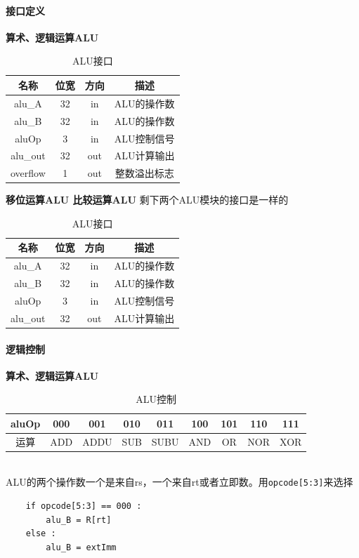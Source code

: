 \documentclass[UTF8]{ctexart}
\begin{document}
\paragraph{接口定义}
\textbf{算术、逻辑运算ALU}
\begin{table}[h]
    \centering
    \begin{tabular}{|c|c|c|c|}
        \hline  
        名称 & 位宽 & 方向 & 描述 \\
        \hline  
        alu\_A & 32 & in & ALU的操作数 \\
        \hline 
        alu\_B & 32 & in & ALU的操作数 \\
        \hline 
        aluOp & 3 & in & ALU控制信号 \\
        \hline
        alu\_out & 32 & out & ALU计算输出 \\
        \hline
        overflow & 1 & out & 整数溢出标志 \\
        \hline
    \end{tabular}
    \caption{ALU接口}
\end{table}

\textbf{移位运算ALU 比较运算ALU}
剩下两个ALU模块的接口是一样的
\begin{table}[h]
    \centering
    \begin{tabular}{|c|c|c|c|}
        \hline  
        名称 & 位宽 & 方向 & 描述 \\
        \hline  
        alu\_A & 32 & in & ALU的操作数 \\
        \hline 
        alu\_B & 32 & in & ALU的操作数 \\
        \hline 
        aluOp & 3 & in & ALU控制信号 \\
        \hline
        alu\_out & 32 & out & ALU计算输出 \\
        \hline

    \end{tabular}
    \caption{ALU接口}
\end{table}

\paragraph{逻辑控制} 
\textbf{算术、逻辑运算ALU} \\
\begin{table}[h]
    \centering
    \begin{tabular}{|c|c|c|c|c|c|c|c|c|}
        \hline
        aluOp & 000 & 001 & 010 & 011 & 100 & 101 & 110 & 111 \\ \hline
        运算  & ADD & ADDU & SUB & SUBU & AND & OR & NOR & XOR \\ \hline
    \end{tabular}
    \caption{ALU控制}
\end{table} \\
ALU的两个操作数一个是来自rs，一个来自rt或者立即数。用\texttt{opcode[5:3]}来选择
\begin{verbatim}
    if opcode[5:3] == 000 :
        alu_B = R[rt]
    else :
        alu_B = extImm 
\end{verbatim}
\end{document}
